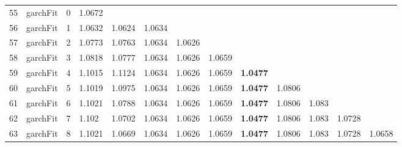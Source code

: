 \documentclass[10pt,a4paper]{article}
\begin{document}
\begin{table}[ht]
\begin{tabular}{rlrllllllllll}
   \hline
55 & garchFit &     0 & 1.0672 &  &  &  &  &  &  &  &  &  \\ 
  56 & garchFit &     1 & 1.0632 & 1.0624 & 1.0634 &  &  &  &  &  &  &  \\ 
  57 & garchFit &     2 & 1.0773 & 1.0763 & 1.0634 & 1.0626 &  &  &  &  &  &  \\ 
  58 & garchFit &     3 & 1.0818 & 1.0777 & 1.0634 & 1.0626 & 1.0659 &  &  &  &  &  \\ 
  59 & garchFit &     4 & 1.1015 & 1.1124 & 1.0634 & 1.0626 & 1.0659 & \textbf{1.0477} &  &  &  &  \\ 
  60 & garchFit &     5 & 1.1019 & 1.0975 & 1.0634 & 1.0626 & 1.0659 & \textbf{1.0477} & 1.0806 &  &  &  \\ 
  61 & garchFit &     6 & 1.1021 & 1.0788 & 1.0634 & 1.0626 & 1.0659 & \textbf{1.0477} & 1.0806 & 1.083 &  &  \\ 
  62 & garchFit &     7 & 1.102 & 1.0702 & 1.0634 & 1.0626 & 1.0659 & \textbf{1.0477} & 1.0806 & 1.083 & 1.0728 &  \\ 
  63 & garchFit &     8 & 1.1021 & 1.0669 & 1.0634 & 1.0626 & 1.0659 & \textbf{1.0477} & 1.0806 & 1.083 & 1.0728 & 1.0658 \\ 
   \hline
\end{tabular}
\end{table}
\end{document}
